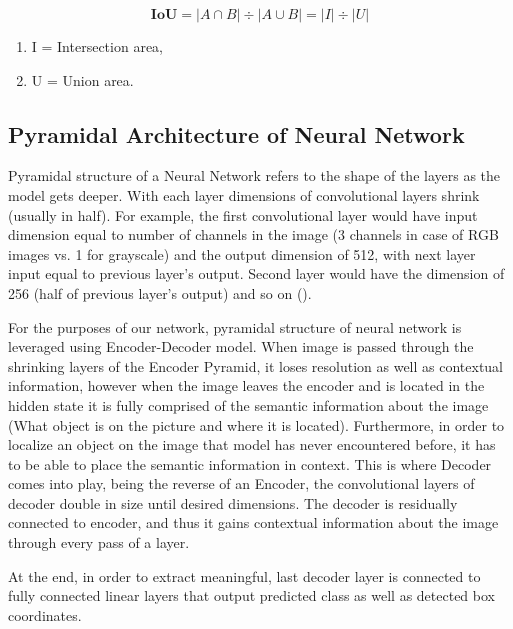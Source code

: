 \documentclass{article}
\begin{document}
\begin{equation}
	\textbf{IoU} = |A \cap B| \div  |A \cup B| = |I| \div |U|
\end{equation}

\begingroup
\fontsize{7pt}{9pt}\selectfont
\begin{enumerate}
	\item[]  \begin{center} I = Intersection area, \end{center}
	\item[] \begin{center}  U = Union area. \end{center}
\end{enumerate}
\endgroup


\subsection{Pyramidal Architecture of Neural Network}


Pyramidal structure of a Neural Network refers to the shape of the layers as the model
gets deeper. With each layer dimensions of convolutional layers shrink (usually in half).
For example, the first convolutional layer would have input dimension equal to number of
channels in the image (3 channels in case of RGB images vs. 1 for grayscale) and the output
dimension of 512, with next layer input equal to previous layer's output. Second layer
would have the dimension of 256 (half of previous layer's output) and so on ().

For the purposes of our network, pyramidal structure of neural network is leveraged using
Encoder-Decoder model. When image is passed through the shrinking layers of the Encoder
Pyramid, it loses resolution as well as contextual information, however when the image
leaves the encoder and is located in the hidden state it is fully comprised of
the semantic information about the image (What object is on the picture and where it is
located). Furthermore, in order to localize an object on the image that model has never 
encountered before, it has to be able to place the semantic information in context. 
This is where Decoder comes into play, being the reverse of an Encoder, the convolutional
layers of decoder double in size until desired dimensions. The decoder is residually
connected to encoder, and thus it gains contextual information about the image through
every pass of a layer.

At the end, in order to extract meaningful, last decoder layer is connected
to fully connected linear layers that  output predicted class as well as
detected box coordinates.
\end{document}
